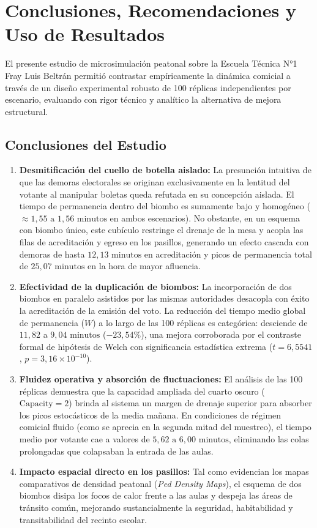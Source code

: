 \documentclass[11pt,a4paper]{article}
\begin{document}
\section{Conclusiones, Recomendaciones y Uso de Resultados}

El presente estudio de microsimulación peatonal sobre la Escuela Técnica N°1 Fray Luis Beltrán permitió contrastar empíricamente la dinámica comicial a través de un diseño experimental robusto de 100 réplicas independientes por escenario, evaluando con rigor técnico y analítico la alternativa de mejora estructural.

\subsection{Conclusiones del Estudio}
\begin{enumerate}
    \item \textbf{Desmitificación del cuello de botella aislado:} La presunción intuitiva de que las demoras electorales se originan exclusivamente en la lentitud del votante al manipular boletas queda refutada en su concepción aislada. El tiempo de permanencia dentro del biombo es sumamente bajo y homogéneo ($\approx 1{,}55\text{ a }1{,}56\text{ minutos}$ en ambos escenarios). No obstante, en un esquema con biombo único, este cubículo restringe el drenaje de la mesa y acopla las filas de acreditación y egreso en los pasillos, generando un efecto cascada con demoras de hasta $12{,}13\text{ minutos}$ en acreditación y picos de permanencia total de $25{,}07\text{ minutos}$ en la hora de mayor afluencia.
    \item \textbf{Efectividad de la duplicación de biombos:} La incorporación de dos biombos en paralelo asistidos por las mismas autoridades desacopla con éxito la acreditación de la emisión del voto. La reducción del tiempo medio global de permanencia ($W$) a lo largo de las 100 réplicas es categórica: desciende de $11{,}82$ a $9{,}04\text{ minutos}$ ($-23{,}54\%$), una mejora corroborada por el contraste formal de hipótesis de Welch con significancia estadística extrema ($t = 6{,}5541$, $p = 3{,}16 \times 10^{-10}$).
    \item \textbf{Fluidez operativa y absorción de fluctuaciones:} El análisis de las 100 réplicas demuestra que la capacidad ampliada del cuarto oscuro ($\text{Capacity} = 2$) brinda al sistema un margen de drenaje superior para absorber los picos estocásticos de la media mañana. En condiciones de régimen comicial fluido (como se aprecia en la segunda mitad del muestreo), el tiempo medio por votante cae a valores de $5{,}62\text{ a }6{,}00\text{ minutos}$, eliminando las colas prolongadas que colapsaban la entrada de las aulas.
    \item \textbf{Impacto espacial directo en los pasillos:} Tal como evidencian los mapas comparativos de densidad peatonal (\textit{Ped Density Maps}), el esquema de dos biombos disipa los focos de calor frente a las aulas y despeja las áreas de tránsito común, mejorando sustancialmente la seguridad, habitabilidad y transitabilidad del recinto escolar.
\end{enumerate}
\end{document}
